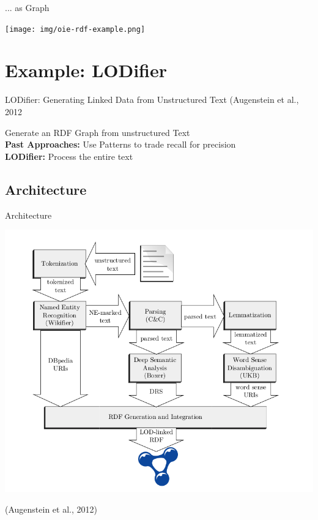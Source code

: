 \documentclass[11pt]{beamer}
\begin{document}
		\begin{frame}{... as Graph}
			\begin{center}
				\texttt{[image: img/oie-rdf-example.png]}
			\end{center}			
		\end{frame}

\section{Example: LODifier}
	\begin{frame}{LODifier: Generating Linked Data from Unstructured Text (Augenstein et al., 2012}
		\begin{center}
			Generate an RDF Graph from unstructured Text\\
			\vspace{15pt}
			\textbf{Past Approaches:} Use Patterns to trade recall for precision\\
			\textbf{LODifier:} Process the entire text
		\end{center}
	\end{frame}
	\subsection{Architecture}
		\begin{frame}{Architecture}
			\begin{center}
				\includegraphics[scale=0.22]{img/oie-lodifier-architecture.png}
			\end{center}
			\tiny{(Augenstein et al., 2012)}
		\end{frame}
		
\end{document}

